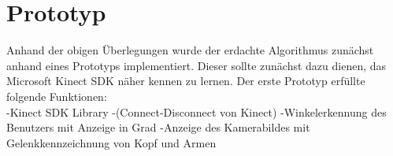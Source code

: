 \section{Prototyp}
Anhand der obigen Überlegungen wurde der erdachte Algorithmus zunächst anhand eines Prototyps implementiert. Dieser sollte zunächst dazu dienen, das Microsoft Kinect SDK näher kennen zu lernen. Der erste Prototyp erfüllte folgende Funktionen:\\
-Kinect SDK Library
-(Connect-Disconnect von Kinect)
-Winkelerkennung des Benutzers mit Anzeige in Grad
-Anzeige des Kamerabildes mit Gelenkkennzeichnung von Kopf und Armen



